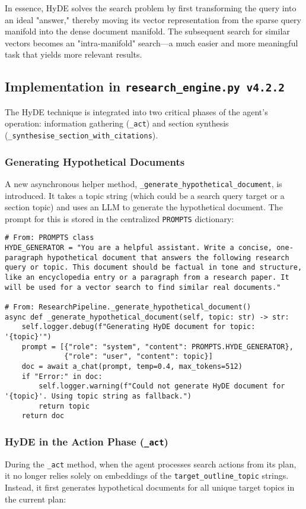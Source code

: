 \documentclass[12pt, a4paper]{article}
\begin{document}
In essence, HyDE solves the search problem by first transforming the query into an ideal "answer," thereby moving its vector representation from the sparse query manifold into the dense document manifold. The subsequent search for similar vectors becomes an "intra-manifold" search—a much easier and more meaningful task that yields more relevant results.

\subsection{Implementation in \texttt{research\_engine.py v4.2.2}}
The HyDE technique is integrated into two critical phases of the agent's operation: information gathering (\verb|_act|) and section synthesis (\verb|_synthesise_section_with_citations|).

\subsubsection{Generating Hypothetical Documents}
A new asynchronous helper method, \verb|_generate_hypothetical_document|, is introduced. It takes a topic string (which could be a search query target or a section topic) and uses an LLM to generate the hypothetical document. The prompt for this is stored in the centralized \verb|PROMPTS| dictionary:

\begin{lstlisting}[style=myPython]
# From: PROMPTS class
HYDE_GENERATOR = "You are a helpful assistant. Write a concise, one-paragraph hypothetical document that answers the following research query or topic. This document should be factual in tone and structure, like an encyclopedia entry or a paragraph from a research paper. It will be used for a vector search to find similar real documents."

# From: ResearchPipeline._generate_hypothetical_document()
async def _generate_hypothetical_document(self, topic: str) -> str:
    self.logger.debug(f"Generating HyDE document for topic: '{topic}'")
    prompt = [{"role": "system", "content": PROMPTS.HYDE_GENERATOR}, 
              {"role": "user", "content": topic}]
    doc = await a_chat(prompt, temp=0.4, max_tokens=512)
    if "Error:" in doc:
        self.logger.warning(f"Could not generate HyDE document for '{topic}'. Using topic string as fallback.")
        return topic
    return doc
\end{lstlisting}

\subsubsection{HyDE in the Action Phase (\texttt{\_act})}
During the \verb|_act| method, when the agent processes search actions from its plan, it no longer relies solely on embeddings of the \verb|target_outline_topic| strings. Instead, it first generates hypothetical documents for all unique target topics in the current plan:
\end{document}

